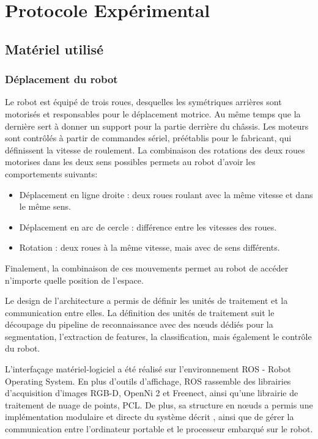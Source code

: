 \chapter {Protocole Expérimental}


\section{Matériel utilisé}

\subsection{Déplacement du robot}

Le robot est équipé de trois roues, desquelles les symétriques
arrières sont motorisés et responsables pour le déplacement
motrice. Au même temps que la dernière sert à donner un support pour
la partie derrière du châssis. Les moteurs sont contrôlés à
partir de commandes sériel, préétablis pour le fabricant, qui
définissent la vitesse de roulement. La combinaison des rotations
des deux roues motorises dans les deux sens possibles permets au
robot d'avoir les comportements suivants:

\begin {itemize}
\item Déplacement en ligne droite : deux roues roulant avec la même vitesse et dans le même sens.

\item Déplacement en arc de cercle : différence entre les vitesses des roues.

\item Rotation : deux roues à la même vitesse, mais avec de sens différents.
\end{itemize}

Finalement, la combinaison de ces mouvements permet au robot de
accéder n'importe quelle position de l’espace.


Le design de l'architecture a permis de définir les unités de traitement et la communication entre elles. La définition des unités de traitement suit le découpage du pipeline de reconnaissance avec des nœuds dédiés pour la segmentation, l'extraction de features, la classification, mais également le contrôle du robot.

L'interfaçage matériel-logiciel a été réalisé sur l'environnement ROS - Robot Operating System. En plus d'outils d'affichage, ROS rassemble des librairies d'acquisition d'images RGB-D, OpenNi 2 et Freenect, ainsi qu'une librairie de traitement de nuage de points, PCL.
De plus, sa structure en nœuds a permis une implémentation modulaire et directe du système décrit , ainsi que de gérer la communication entre l'ordinateur portable et le processeur embarqué sur le robot.

